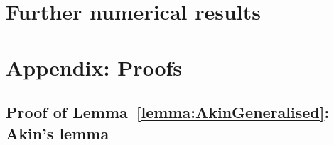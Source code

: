 \documentclass[9pt,twoside,lineno]{pnas-new}
\theoremstyle{plainCl1}
\theoremstyle{plainCl2}
\begin{document}

\section{Further numerical results}\label{section:simulations}





\clearpage
\newpage




\section{Appendix: Proofs}
\label{section:appendix}


\subsection{Proof of Lemma~\ref{lemma:AkinGeneralised}: Akin's lemma}
\end{document}
